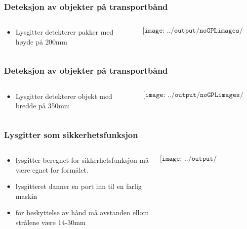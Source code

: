 \documentclass[aspectratio=169,xcolor=dvipsnames]{beamer}
\begin{document}
\begin{frame}
	\frametitle{Deteksjon av objekter på transportbånd}
	\begin{columns}
		\begin{column}{0.5\textwidth}
			\begin{itemize}
				\item Lysgitter detekterer pakker med høyde på 200mm
			\end{itemize}

			
		\end{column}

		\begin{column}{0.5\textwidth}
	$$\texttt{[image: ../output/noGPLimages/limit40.png]}$$
		\end{column}
	\end{columns}
\end{frame}
\begin{frame}
	\frametitle{Deteksjon av objekter på transportbånd}
	\begin{columns}
		\begin{column}{0.5\textwidth}
			\begin{itemize}
				\item Lysgitter detekterer objekt med bredde på 350mm
			\end{itemize}

			
		\end{column}

		\begin{column}{0.5\textwidth}
	$$\texttt{[image: ../output/noGPLimages/limit41.png]}$$
		\end{column}
	\end{columns}
\end{frame}
\begin{frame}
	\frametitle{Lysgitter som sikkerhetsfunksjon}
	\begin{columns}
		\begin{column}{0.5\textwidth}
			\begin{itemize}
				\item lysgitter beregnet for sikkerhetsfunksjon må være egnet for formålet. 
				\item lysgitteret danner en port inn til en farlig maskin
				\item for beskyttelse av hånd må avstanden ellom strålene være 14-30mm
			\end{itemize}

			
		\end{column}

		\begin{column}{0.5\textwidth}
	$$\texttt{[image: ../output/noGPLimages/limit42.png]}$$
		\end{column}
	\end{columns}
\end{frame}
\end{document}
